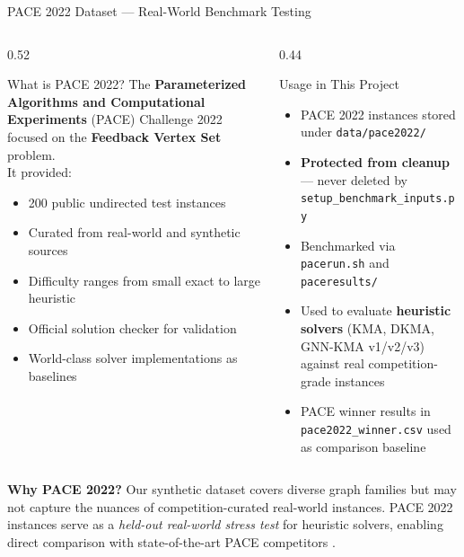 \documentclass[aspectratio=169,10pt]{beamer}
\renewcommand{\footnotesize}{\tiny}
\begin{document}
\begin{frame}{PACE 2022 Dataset — Real-World Benchmark Testing}
  \begin{columns}[T]
    \begin{column}{0.52\textwidth}
      \begin{block}{What is PACE 2022?}
        The \textbf{Parameterized Algorithms and Computational Experiments}
        (PACE) Challenge 2022 \cite{pace2022} focused on the
        \textbf{Feedback Vertex Set} problem.\\[5pt]
        It provided:
        \begin{itemize}
          \item 200 public undirected test instances
          \item Curated from real-world and synthetic sources
          \item Difficulty ranges from small exact to large heuristic
          \item Official solution checker for validation
          \item World-class solver implementations as baselines
        \end{itemize}
      \end{block}
    \end{column}
    \begin{column}{0.44\textwidth}
      \begin{block}{Usage in This Project}
        \begin{itemize}\setlength\itemsep{3pt}
          \item PACE 2022 instances stored under
            \texttt{data/pace2022/}
          \item \textbf{Protected from cleanup} — never deleted
            by \texttt{setup\_benchmark\_inputs.py}
          \item Benchmarked via \texttt{pacerun.sh}
            and \texttt{paceresults/}
          \item Used to evaluate \textbf{heuristic solvers}
            (KMA, DKMA, GNN-KMA v1/v2/v3)
            against real competition-grade instances
          \item PACE winner results in \texttt{pace2022\_winner.csv}
            used as comparison baseline
        \end{itemize}
      \end{block}
    \end{column}
  \end{columns}
  \vspace{4pt}
  \begin{tcolorbox}[orangebox,fontupper=\footnotesize]
    \textbf{Why PACE 2022?} Our synthetic dataset covers diverse graph families
    but may not capture the nuances of competition-curated real-world instances.
    PACE 2022 instances serve as a \emph{held-out real-world stress test}
    for heuristic solvers, enabling direct comparison with state-of-the-art
    PACE competitors \cite{pace2022}.
  \end{tcolorbox}
\end{frame}
\end{document}
